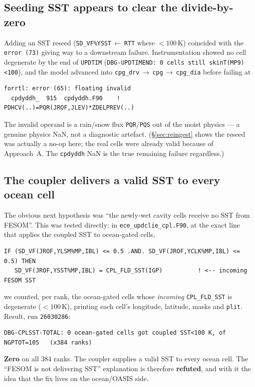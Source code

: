 \documentclass[11pt,a4paper]{article}
\newcommand{\code}[1]{\texttt{\small #1}}
\newcommand{\file}[1]{\texttt{\footnotesize #1}}
\begin{document}
\subsection{Seeding SST appears to clear the divide-by-zero}
Adding an SST reseed (\code{SD\_VF\%YSST}$\,\leftarrow\,$\code{RTT} where $<100$\,K)
coincided with the \code{error (73)} giving way to a downstream failure. Instrumentation
showed no cell degenerate by the end of \code{UPDTIM} (\code{DBG-UPDTIMEND: 0 cells still
skinT(MP9)<100}), and the model advanced into
\code{cpg\_drv}\,$\to$\,\code{cpg}\,$\to$\,\code{cpg\_dia} before failing at
\begin{lstlisting}
forrtl: error (65): floating invalid
  cpdyddh_  915  cpdyddh.F90    ! PDHCV(..)=PQR(JROF,JLEV)*ZDELPREV(..)
\end{lstlisting}
The invalid operand is a rain/snow flux \code{PQR}/\code{PQS} out of the moist physics ---
a genuine physics NaN, not a diagnostic artefact. (\S\ref{sec:reingest} shows the reseed
was actually a no-op here; the real cells were already valid because of Approach~A. The
\code{cpdyddh} NaN is the true remaining failure regardless.)

\subsection{The coupler delivers a valid SST to every ocean cell}\label{sec:cplsst}
The obvious next hypothesis was ``the newly-wet cavity cells receive no SST from FESOM''.
This was tested directly: in \file{ece\_updclie\_cpl.F90}, at the exact line that applies
the coupled SST to ocean-gated cells,
\begin{lstlisting}
IF (SD_VF(JROF,YLSM%MP,IBL) <= 0.5 .AND. SD_VF(JROF,YCLK%MP,IBL) <= 0.5) THEN
   SD_VF(JROF,YSST%MP,IBL) = CPL_FLD_SST(IGP)          ! <-- incoming FESOM SST
\end{lstlisting}
we counted, per rank, the ocean-gated cells whose \emph{incoming} \code{CPL\_FLD\_SST}
is degenerate ($<100$\,K), printing each cell's longitude, latitude, masks and \code{plit}.
Result, run \code{26030286}:
\begin{lstlisting}
DBG-CPLSST-TOTAL: 0 ocean-gated cells got coupled SST<100 K, of NGPTOT=105   (x384 ranks)
\end{lstlisting}
\textbf{Zero} on all $384$ ranks. The coupler supplies a valid SST to every ocean cell.
The ``FESOM is not delivering SST'' explanation is therefore \textbf{refuted}, and with it
the idea that the fix lives on the ocean/OASIS side.
\end{document}
